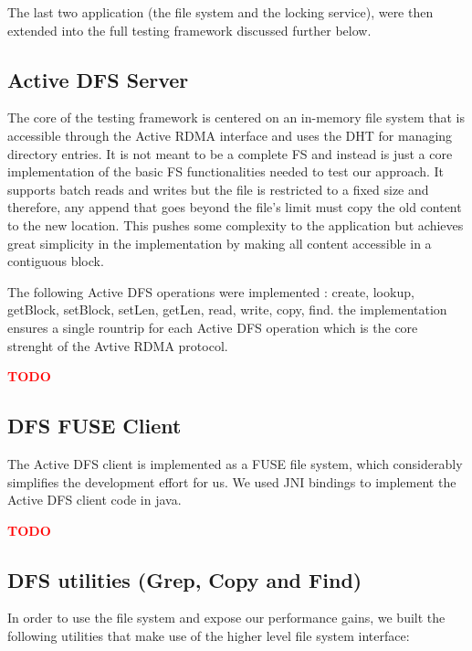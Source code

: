 \documentclass[10pt]{article}
\newcommand{\PROBLEM}[1] {\textbf{\textcolor{red}{#1}}}
\begin{document}
The last two application (the file system and the locking service), were then extended into the full testing framework discussed further below.

\subsection{Active DFS Server}

The core of the testing framework is centered on an in-memory file system that is accessible through the Active RDMA interface and uses the DHT for managing directory entries. It is not meant to be a complete FS and instead is just a core implementation of the basic FS functionalities needed to test our approach. It supports batch reads and writes but the file is restricted to a fixed size and therefore, any append that goes beyond the file's limit must copy the old content to the new location. This pushes some complexity to the application but achieves great simplicity in the implementation by making all content accessible in a contiguous block.

The following Active DFS operations were implemented : create, lookup, getBlock, setBlock, setLen, getLen, read, write, copy, find. the implementation ensures a single rountrip for each Active DFS operation which is the core strenght of the Avtive RDMA protocol.

\PROBLEM{TODO}

\subsection{DFS FUSE Client}

The Active DFS client is implemented as a FUSE file system, which considerably simplifies the development effort for us. We used JNI bindings to implement the Active DFS client code in java.

\PROBLEM{TODO}

\subsection{DFS utilities (Grep, Copy and Find)}

In order to use the file system and expose our performance gains, we built the following utilities that make use of the higher level file system interface:
\end{document}
